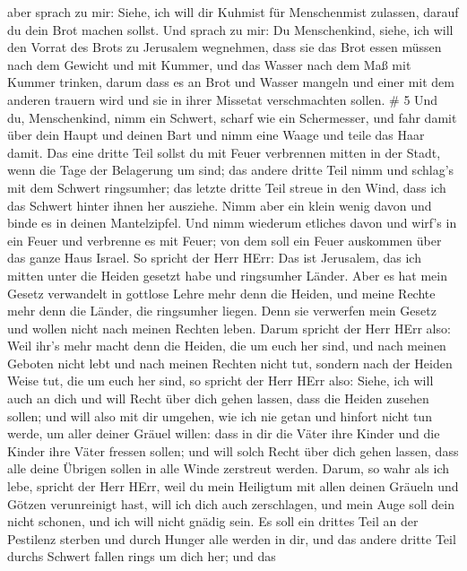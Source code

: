 aber sprach zu mir: Siehe, ich will dir Kuhmist für Menschenmist
zulassen, darauf du dein Brot machen sollst.  Und sprach zu
mir: Du Menschenkind, siehe, ich will den Vorrat des Brots zu Jerusalem
wegnehmen, dass sie das Brot essen müssen nach dem Gewicht und mit
Kummer, und das Wasser nach dem Maß mit Kummer trinken, 
darum dass es an Brot und Wasser mangeln und einer mit dem anderen
trauern wird und sie in ihrer Missetat verschmachten sollen. \# 5
 Und du, Menschenkind, nimm ein Schwert, scharf wie ein
Schermesser, und fahr damit über dein Haupt und deinen Bart und nimm
eine Waage und teile das Haar damit.  Das eine dritte Teil
sollst du mit Feuer verbrennen mitten in der Stadt, wenn die Tage der
Belagerung um sind; das andere dritte Teil nimm und schlag's mit dem
Schwert ringsumher; das letzte dritte Teil streue in den Wind, dass ich
das Schwert hinter ihnen her ausziehe.  Nimm aber ein klein
wenig davon und binde es in deinen Mantelzipfel.  Und nimm
wiederum etliches davon und wirf's in ein Feuer und verbrenne es mit
Feuer; von dem soll ein Feuer auskommen über das ganze Haus Israel.
 So spricht der Herr HErr: Das ist Jerusalem, das ich mitten
unter die Heiden gesetzt habe und ringsumher Länder.  Aber
es hat mein Gesetz verwandelt in gottlose Lehre mehr denn die Heiden,
und meine Rechte mehr denn die Länder, die ringsumher liegen. Denn sie
verwerfen mein Gesetz und wollen nicht nach meinen Rechten leben.
 Darum spricht der Herr HErr also: Weil ihr's mehr macht
denn die Heiden, die um euch her sind, und nach meinen Geboten nicht
lebt und nach meinen Rechten nicht tut, sondern nach der Heiden Weise
tut, die um euch her sind,  so spricht der Herr HErr also:
Siehe, ich will auch an dich und will Recht über dich gehen lassen, dass
die Heiden zusehen sollen;  und will also mit dir umgehen,
wie ich nie getan und hinfort nicht tun werde, um aller deiner Gräuel
willen:  dass in dir die Väter ihre Kinder und die Kinder
ihre Väter fressen sollen; und will solch Recht über dich gehen lassen,
dass alle deine Übrigen sollen in alle Winde zerstreut werden.
 Darum, so wahr als ich lebe, spricht der Herr HErr, weil
du mein Heiligtum mit allen deinen Gräueln und Götzen verunreinigt hast,
will ich dich auch zerschlagen, und mein Auge soll dein nicht schonen,
und ich will nicht gnädig sein.  Es soll ein drittes Teil
an der Pestilenz sterben und durch Hunger alle werden in dir, und das
andere dritte Teil durchs Schwert fallen rings um dich her; und das
